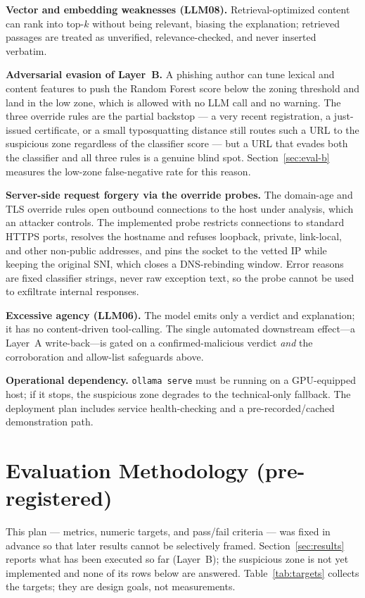 \documentclass[conference]{IEEEtran}
\begin{document}
\textbf{Vector and embedding weaknesses (LLM08).} Retrieval-optimized content can
rank into top-$k$ without being relevant, biasing the explanation; retrieved
passages are treated as unverified, relevance-checked, and never inserted
verbatim.

\textbf{Adversarial evasion of Layer~B.} A phishing author can tune lexical and
content features to push the Random Forest score below the zoning threshold and
land in the low zone, which is allowed with no LLM call and no warning. The three
override rules are the partial backstop --- a very recent registration, a
just-issued certificate, or a small typosquatting distance still routes such a
URL to the suspicious zone regardless of the classifier score --- but a URL that
evades both the classifier and all three rules is a genuine blind spot.
Section~\ref{sec:eval-b} measures the low-zone false-negative rate for this
reason.

\textbf{Server-side request forgery via the override probes.} The domain-age and
TLS override rules open outbound connections to the host under analysis, which an
attacker controls. The implemented probe restricts connections to standard HTTPS
ports, resolves the hostname and refuses loopback, private, link-local, and other
non-public addresses, and pins the socket to the vetted IP while keeping the
original SNI, which closes a DNS-rebinding window. Error reasons are fixed
classifier strings, never raw exception text, so the probe cannot be used to
exfiltrate internal responses.

\textbf{Excessive agency (LLM06).} The model emits only a verdict and
explanation; it has no content-driven tool-calling. The single automated
downstream effect---a Layer~A write-back---is gated on a confirmed-malicious
verdict \emph{and} the corroboration and allow-list safeguards above.

\textbf{Operational dependency.} \texttt{ollama serve} must be running on a
GPU-equipped host; if it stops, the suspicious zone degrades to the
technical-only fallback. The deployment plan includes service health-checking and
a pre-recorded/cached demonstration path.

\section{Evaluation Methodology (pre-registered)}
\label{sec:eval}
This plan --- metrics, numeric targets, and pass/fail criteria --- was fixed in
advance so that later results cannot be selectively framed. Section~\ref{sec:results}
reports what has been executed so far (Layer~B); the suspicious zone is not yet
implemented and none of its rows below are answered. Table~\ref{tab:targets}
collects the targets; they are design goals, not measurements.
\end{document}
